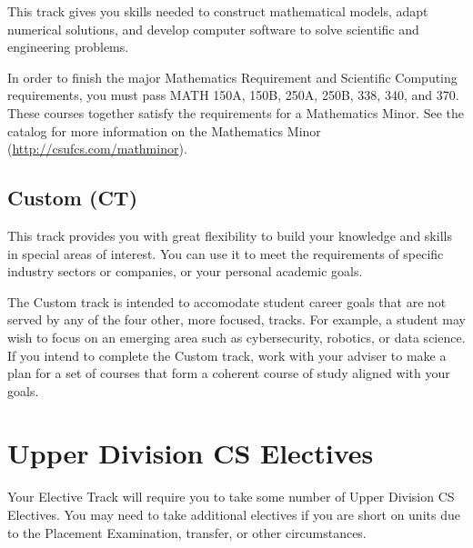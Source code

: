 \documentclass{book}
\newcommand{\CtTrackName}{Custom (CT)}
\newcommand{\shrunkurl}[1]{\url{http://csufcs.com/#1}}
\begin{document}
This track gives you skills needed to construct mathematical models, adapt numerical solutions, and develop computer software to solve scientific and engineering problems.

In order to finish the major Mathematics Requirement and Scientific Computing requirements, you must pass MATH 150A, 150B, 250A, 250B, 338, 340, and 370. These courses together satisfy the requirements for a Mathematics Minor. See the catalog for more information on the Mathematics Minor (\shrunkurl{mathminor}).

\subsection{\CtTrackName}
\CtTrackIndex

This track provides you with great flexibility to build your knowledge and skills in special areas of interest. You can use it to meet the requirements of specific industry sectors or companies, or your personal academic goals.

The Custom track is intended to accomodate student career goals that are not served by any of the four other, more focused, tracks. For example, a student may wish to focus on an emerging area such as cybersecurity, robotics, or data science. If you intend to complete the Custom track, work with your adviser to make a plan for a set of courses that form a coherent course of study aligned with your goals.

\section{Upper Division CS Electives}
\label{section:upper_division_cs_electives}

Your Elective Track will require you to take some number of Upper Division CS Electives. You may need to take additional electives if you are short on units due to the Placement Examination, transfer, or other circumstances.
\end{document}
